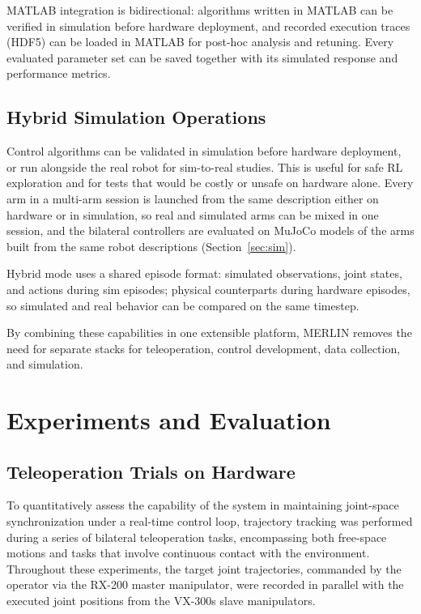 \documentclass[a4paper, 10pt, conference]{ieeeconf}      %
\begin{document}
MATLAB integration is bidirectional: algorithms written in MATLAB can be verified in simulation before hardware deployment, and recorded execution traces (HDF5) can be loaded in MATLAB for post-hoc analysis and retuning. Every evaluated parameter set can be saved together with its simulated response and performance metrics.

\subsection{Hybrid Simulation Operations}
Control algorithms can be validated in simulation before hardware deployment, or run alongside the real robot for sim-to-real studies. This is useful for safe RL exploration and for tests that would be costly or unsafe on hardware alone. Every arm in a multi-arm session is launched from the same description either on hardware or in simulation, so real and simulated arms can be mixed in one session, and the bilateral controllers are evaluated on MuJoCo \cite{todorov2012mujoco} models of the arms built from the same robot descriptions (Section~\ref{sec:sim}).

Hybrid mode uses a shared episode format: simulated observations, joint states, and actions during sim episodes; physical counterparts during hardware episodes, so simulated and real behavior can be compared on the same timestep.

By combining these capabilities in one extensible platform, MERLIN removes the need for separate stacks for teleoperation, control development, data collection, and simulation.

\section{Experiments and Evaluation}
\label{sec:experiments}

\subsection{Teleoperation Trials on Hardware}
To quantitatively assess the capability of the system in maintaining joint-space synchronization under a real-time control loop, trajectory tracking was performed during a series of bilateral teleoperation tasks, encompassing both free-space motions and tasks that involve continuous contact with the environment. Throughout these experiments, the target joint trajectories, commanded by the operator via the RX-200 master manipulator, were recorded in parallel with the executed joint positions from the VX-300s slave manipulators.
\end{document}

